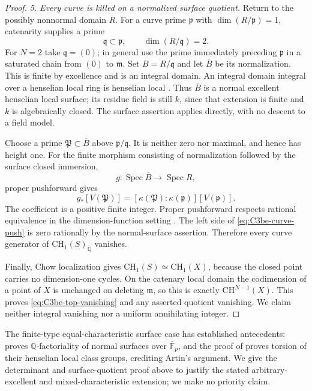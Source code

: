 \begin{proof}
\emph{5. Every curve is killed on a normalized surface quotient.}
Return to the possibly nonnormal domain \(R\). For a curve
prime \(\mathfrak p\) with \(\dim(R/\mathfrak p)=1\),
catenarity supplies a prime
\[
              \mathfrak q\subset\mathfrak p,\qquad
                              \dim(R/\mathfrak q)=2.
\]
For \(N=2\) take \(\mathfrak q=(0)\); in general use the
prime immediately preceding \(\mathfrak p\) in a saturated
chain from \((0)\) to \(\mathfrak m\). Set \(B=R/\mathfrak q\)
and let \(\overline B\) be its normalization. This is finite
by excellence and is an integral domain. An integral domain
integral over a henselian local ring is henselian local
\citep[Lemma 15.106.23, Tag 092X]
{frC3beStacksIntegralHenselian}. Thus \(\overline B\) is a
normal excellent henselian local surface; its residue field
is still \(k\), since that extension is finite and
\(k\) is algebraically closed. The surface assertion applies
directly, with no descent to a field model.

Choose a prime \(\mathfrak P\subset\overline B\) above
\(\mathfrak p/\mathfrak q\). It is neither zero nor maximal,
and hence has height one. For the finite morphism consisting
of normalization followed by the surface closed immersion,
\[
              g:\operatorname{Spec}\overline B
                            \longrightarrow\operatorname{Spec}R,
\]
proper pushforward gives
\begin{equation}\label{eq:C3be-curve-push}
       g_*[V(\mathfrak P)]
          =[\kappa(\mathfrak P):\kappa(\mathfrak p)]
                                      [V(\mathfrak p)].
\end{equation}
The coefficient is a positive finite integer. Proper pushforward
respects rational equivalence in the dimension-function setting
\citep[Lemma 42.20.3, Tag 02S2]{frC3beStacksProperPush}.
The left side of \eqref{eq:C3be-curve-push} is zero rationally
by the normal-surface assertion. Therefore every curve generator
of \(\mathrm{CH}_1(S)_{\mathbb Q}\) vanishes.

Finally, Chow localization
\citep[Lemma 42.19.3, Tag 02RX]{frC3beStacksChowLocalization}
gives \(\mathrm{CH}_1(S)\simeq\mathrm{CH}_1(X)\), because
the closed point carries no dimension-one cycles. On the
catenary local domain the codimension of a point of \(X\)
is unchanged on deleting \(\mathfrak m\), so this is exactly
\(\mathrm{CH}^{N-1}(X)\). This proves
\eqref{eq:C3be-top-vanishing} and any asserted quotient
vanishing. We claim neither integral vanishing nor a uniform
annihilating integer.
\end{proof}

The finite-type equal-characteristic surface case has established
antecedents: \citet[Theorem 4.5, p. 42, proof and Remark 4.9,
p. 43]{frC3beTanaka2014} proves \(\mathbb Q\)-factoriality of
normal surfaces over \(\overline{\mathbb F}_p\), and the proof
of \citet[Theorem 2.4, author pp. 4--5]{frC3beEsser2023}
proves torsion of their henselian local class groups, crediting
Artin's argument. We give the determinant and surface-quotient
proof above to justify the stated arbitrary-excellent and
mixed-characteristic extension; we make no priority claim.
